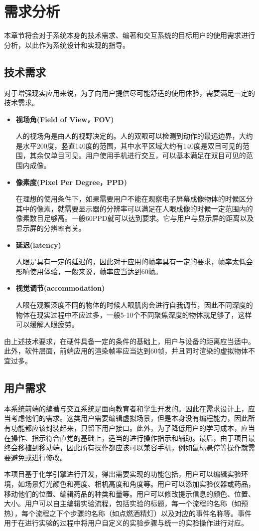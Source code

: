 \chapter{需求分析}
\label{requirement}

本章节将会对于系统本身的技术需求、编著和交互系统的目标用户的使用需求进行分析，以此作为系统设计和实现的指导。

\section{技术需求}
对于增强现实应用来说，为了向用户提供尽可能舒适的使用体验，需要满足一定的技术需求。\cite{artech}

\begin{itemize}
    \item \textbf{视场角(Field of View，FOV)}
    
       人的视场角是由人的视野决定的。人的双眼可以检测到动作的最远边界，大约是水平200度，竖直140度的范围，其中水平区域大约有140度是双目可见的范围，其余仅单目可见。用户使用手机进行交互，可以基本满足在双目可见的范围内成像。
    
    \item \textbf{像素度(Pixel Per Degree，PPD)}
    
     在理想的使用条件下，如果需要用户不能在观察电子屏幕成像物体的时候区分其中的像素，就需要显示器的分辨率可以满足在人眼成像的时候一定范围内的像素数目足够高。一般60PPD就可以达到要求。它与用户与显示屏的距离以及显示屏的分辨率有关。
    
    \item \textbf{延迟(latency)}
    
      人眼是具有一定的延迟的，因此对于应用的帧率具有一定的要求，帧率太低会影响使用体验，一般来说，帧率应当达到60帧。
    
    \item \textbf{视觉调节(accommodation)}
    
    人眼在观察深度不同的物体的时候人眼肌肉会进行自我调节，因此不同深度的物体在现实过程中不应过多，一般5-10个不同聚焦深度的物体就足够了，这样可以缓解人眼疲劳。
\end{itemize}

\indent    	由上述技术要求，在硬件具备一定的条件的基础上，用户与设备的距离应当适中。此外，软件层面，前端应用的渲染帧率应当达到60帧，并且同时渲染的虚拟物体不宜过多。

\section{用户需求}
本系统前端的编著与交互系统是面向教育者和学生开发的。因此在需求设计上，应当考虑他们的需求。这类用户需要编辑虚拟场景，但是本身没有编程能力，因此所有功能都应该封装起来，只留下用户接口。此外，为了降低用户的学习成本，应当在操作、指示符合直觉的基础上，适当的进行操作指示和辅助。最后，由于项目最终会移植到移动端，因此所有操作都应该可以兼容手机，例如鼠标悬停等操作就需要避免或进行修改。

本项目基于化学引擎进行开发，得出需要实现的功能包括，用户可以编辑实验环境，如场景灯光颜色和亮度、相机高度和角度等。用户可以添加实验仪器或药品，移动他们的位置、编辑药品的种类和量等。用户可以修改提示信息的颜色、位置、大小。用户可以自主编辑实验流程，包括实验的标题，每一个流程的名称（如预热），每个流程之下个步骤的名称（如点燃酒精灯）以及对应的事件名称等。事件用于在进行实验的过程中将用户自定义的实验步骤与统一的实验操作进行对应。